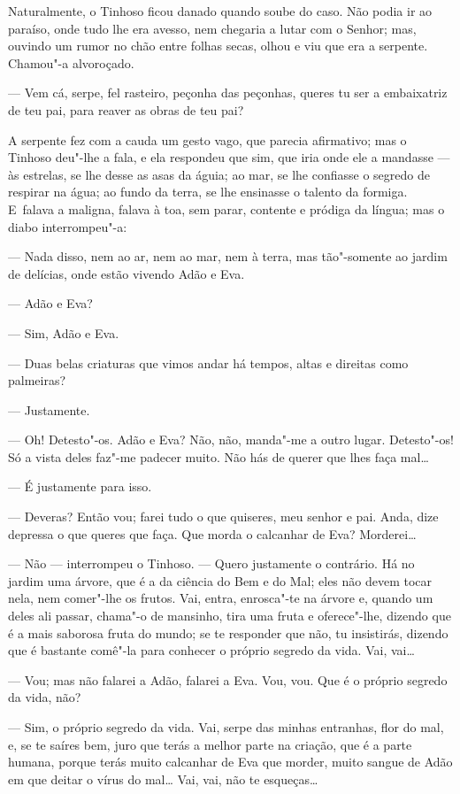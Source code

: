\begin{linenumbers}
Naturalmente, o Tinhoso ficou danado quando soube do caso. Não podia ir
ao paraíso, onde tudo lhe era avesso, nem chegaria a lutar com o Senhor;
mas, ouvindo um rumor no chão entre folhas secas, olhou e viu que era a
serpente. Chamou"-a alvoroçado.

--- Vem cá, serpe, fel rasteiro, peçonha das peçonhas, queres tu ser a
embaixatriz de teu pai, para reaver as obras de teu pai?

A serpente fez com a cauda um gesto vago, que parecia afirmativo; mas o
Tinhoso deu"-lhe a fala, e ela respondeu que sim, que iria onde ele a
mandasse --- às estrelas, se lhe desse as asas da águia; ao mar, se lhe
confiasse o segredo de respirar na água; ao fundo da terra, se lhe
ensinasse o talento da formiga. E~falava a maligna, falava à toa, sem
parar, contente e pródiga da língua; mas o diabo interrompeu"-a:

--- Nada disso, nem ao ar, nem ao mar, nem à terra, mas tão"-somente ao
jardim de delícias, onde estão vivendo Adão e Eva.

--- Adão e Eva?

--- Sim, Adão e Eva.

--- Duas belas criaturas que vimos andar há tempos, altas e direitas como
palmeiras?

--- Justamente.

--- Oh! Detesto"-os. Adão e Eva? Não, não, manda"-me a outro lugar.
Detesto"-os! Só a vista deles faz"-me padecer muito. Não hás de querer que
lhes faça mal\ldots{}

--- É justamente para isso.

--- Deveras? Então vou; farei tudo o que quiseres, meu senhor e pai.
Anda, dize depressa o que queres que faça. Que morda o calcanhar de Eva?
Morderei\ldots{}

--- Não --- interrompeu o Tinhoso. --- Quero justamente o contrário. Há no
jardim uma árvore, que é a da ciência do Bem e do Mal; eles não devem
tocar nela, nem comer"-lhe os frutos. Vai, entra, enrosca"-te na árvore e,
quando um deles ali passar, chama"-o de mansinho, tira uma fruta e
oferece"-lhe, dizendo que é a mais saborosa fruta do mundo; se te
responder que não, tu insistirás, dizendo que é bastante comê"-la para
conhecer o próprio segredo da vida. Vai, vai\ldots{}

--- Vou; mas não falarei a Adão, falarei a Eva. Vou, vou. Que é o próprio
segredo da vida, não?

--- Sim, o próprio segredo da vida. Vai, serpe das minhas entranhas, flor
do mal, e, se te saíres bem, juro que terás a melhor parte na criação,
que é a parte humana, porque terás muito calcanhar de Eva que morder,
muito sangue de Adão em que deitar o vírus do mal\ldots{} Vai, vai, não te
esqueças\ldots{}


\end{linenumbers}
